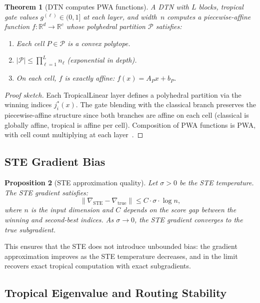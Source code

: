\documentclass[11pt,twocolumn]{article}
\newtheorem{theorem}{Theorem}[section]
\newtheorem{proposition}[theorem]{Proposition}
\newcommand{\R}{\mathbb{R}}
\begin{document}
\begin{theorem}[DTN computes PWA functions]\label{thm:pwa}
A DTN with $L$ blocks, tropical gate values $g^{(\ell)} \in (0, 1]$ at each
layer, and width~$n$ computes a piecewise-affine function
$f : \R^d \to \R^c$ whose polyhedral partition $\mathcal{P}$ satisfies:
\begin{enumerate}[nosep]
  \item Each cell $P \in \mathcal{P}$ is a convex polytope.
  \item $|\mathcal{P}| \leq \prod_{\ell=1}^L n_\ell$ (exponential in depth).
  \item On each cell, $f$ is exactly affine: $f(x) = A_P x + b_P$.
\end{enumerate}
\end{theorem}

\begin{proof}[Proof sketch]
Each TropicalLinear layer defines a polyhedral partition via the winning
indices $j^*_i(x)$. The gate blending with the classical branch preserves
the piecewise-affine structure since both branches are affine on each cell
(classical is globally affine, tropical is affine per cell). Composition of
PWA functions is PWA, with cell count multiplying at each
layer~\cite{scholtes2012introduction}.
\end{proof}

\subsection{STE Gradient Bias}

\begin{proposition}[STE approximation quality]\label{prop:ste}
Let $\sigma > 0$ be the STE temperature. The STE gradient satisfies:
\begin{equation}
  \left\| \nabla_\text{STE} - \nabla_\text{true} \right\|
  \leq C \cdot \sigma \cdot \log n,
\end{equation}
where $n$ is the input dimension and $C$ depends on the score gap between
the winning and second-best indices. As $\sigma \to 0$, the STE gradient
converges to the true subgradient.
\end{proposition}

This ensures that the STE does not introduce unbounded bias: the gradient
approximation improves as the STE temperature decreases, and in the limit
recovers exact tropical computation with exact subgradients.

\subsection{Tropical Eigenvalue and Routing Stability}
\end{document}
